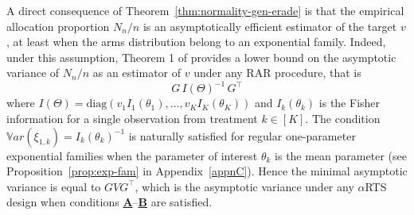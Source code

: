 \begin{remark} A direct consequence of Theorem~\ref{thm:normality-gen-erade} is that the empirical allocation proportion $N_n/n$ is an asymptotically efficient estimator of the target $v$, at least when the arms distribution belong to an exponential family. Indeed, under this assumption, Theorem 1 of \cite{hu2006asymptotically} provides a lower bound on the asymptotic variance of $N_n/n$ as an estimator of $v$ under any RAR procedure, that is
\[G\,I(\Theta)^{-1}\,G^{\top }\]
where  \(I(\Theta) = \mathrm{diag}\left(v_1 I_1(\theta_1), \dots, v_K I_K(\theta_K)\right)\) and \(I_k(\theta_k)\) is the Fisher information for a single observation from treatment \(k \in [K]\). The condition $\mathbb{V}ar(\xi_{1,k}) = I_k(\theta_k)^{-1}$ is naturally satisfied for regular one-parameter exponential families when the parameter of interest $\theta_k$ is the mean parameter (see Proposition~\ref{prop:exp-fam} in Appendix~\ref{appnC}). Hence the minimal asymptotic variance is equal to $GVG^{\top}$, which is the asymptotic variance under any $\alpha$RTS design when conditions \hyperlink{CA}{\textbf{A}}--\hyperlink{CB}{\textbf{B}} are satisfied.
\end{remark}

%
%
%
%
%



